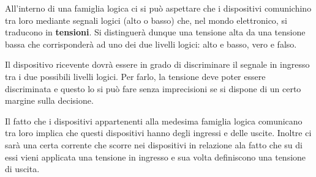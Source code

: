 \documentclass[12pt, a4paper]{report}
\begin{document}
All'interno di una famiglia logica ci si può aspettare che i dispositivi comunichino tra loro mediante segnali logici (alto o basso) che, nel mondo elettronico, si traducono in \textbf{tensioni}. Si distinguerà dunque una tensione alta da una tensione bassa che corrisponderà ad uno dei due livelli logici: alto e basso, vero e falso.

Il dispositivo ricevente dovrà essere in grado di discriminare il segnale in ingresso tra i due possibili livelli logici. Per farlo, la tensione deve poter essere discriminata e questo lo si può fare senza imprecisioni se si dispone di un certo margine sulla decisione.

Il fatto che i dispositivi appartenenti alla medesima famiglia logica comunicano tra loro implica che questi dispositivi hanno degli ingressi e delle uscite. Inoltre ci sarà una certa corrente che scorre nei dispositivi in relazione ala fatto che su di essi vieni applicata una tensione in ingresso e sua volta definiscono una tensione di uscita.
\end{document}
